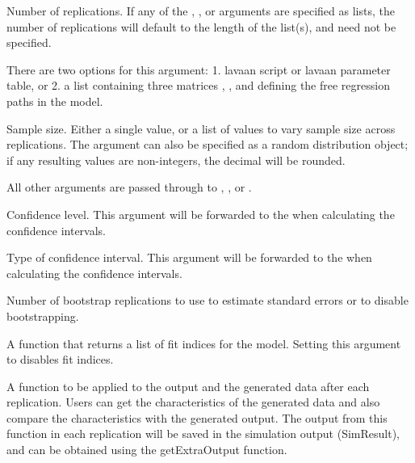 \documentclass[a4paper]{book}
\begin{document}
%
\begin{Arguments}
\begin{ldescription}
\item[\code{nRep}] Number of replications. If any of the , , or  arguments are specified as lists, the number of replications will default to the length of the list(s), and  need not be specified.

\item[\code{model}] There are two options for this argument: 1. lavaan script or lavaan parameter
table, or 2. a list containing three matrices
, , and  defining the free regression paths
in the model.

\item[\code{n}] 
Sample size. Either a single value, or a list of values to vary sample size across replications. The  argument can also be specified as a random distribution object; if any resulting values are non-integers, the decimal will be rounded.


\item[\code{...}] All other arguments are passed through to ,
, or .

\item[\code{cilevel}] Confidence level. This argument will be forwarded to the  when calculating the confidence intervals.

\item[\code{citype}] Type of confidence interval. This argument will be forwarded to the  when calculating the confidence intervals.

\item[\code{boot.R}] Number of bootstrap replications to use to estimate standard errors or  to disable bootstrapping.

\item[\code{fitIndices}] A function that returns a list of fit indices for the model. Setting this argument to  disables fit indices.

\item[\code{outfundata}] A function to be applied to the  output and the 
generated data after each replication. Users can get the characteristics of the 
generated data and also compare the characteristics with the generated output. 
The output from this function in each replication will be saved in the 
simulation output (SimResult), and can be obtained using the getExtraOutput function.


\end{ldescription}
\end{Arguments}
\end{document}

